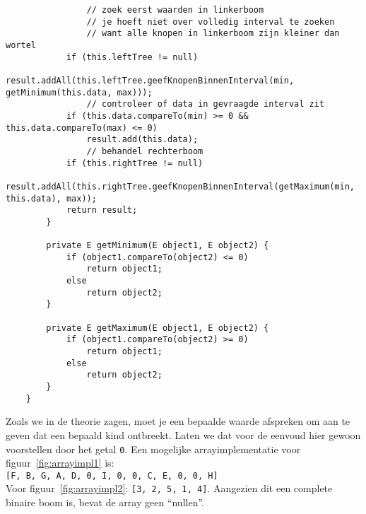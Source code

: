 \begin{Oplossing}{4.22}
\begin{lstlisting}
                // zoek eerst waarden in linkerboom
                // je hoeft niet over volledig interval te zoeken
                // want alle knopen in linkerboom zijn kleiner dan wortel
            if (this.leftTree != null)
                result.addAll(this.leftTree.geefKnopenBinnenInterval(min, getMinimum(this.data, max)));
                // controleer of data in gevraagde interval zit
            if (this.data.compareTo(min) >= 0 && this.data.compareTo(max) <= 0)
                result.add(this.data);
                // behandel rechterboom
            if (this.rightTree != null)
                result.addAll(this.rightTree.geefKnopenBinnenInterval(getMaximum(min, this.data), max));
            return result;
        }

        private E getMinimum(E object1, E object2) {
            if (object1.compareTo(object2) <= 0)
                return object1;
            else
                return object2;
        }

        private E getMaximum(E object1, E object2) {
            if (object1.compareTo(object2) >= 0)
                return object1;
            else
                return object2;
        }
    }
\end{lstlisting}
\end{Oplossing}
\begin{Oplossing}{5.1}
Zoals we in de theorie zagen, moet je een bepaalde waarde afspreken om aan te geven dat een bepaald kind ontbreekt. Laten we dat voor de eenvoud hier gewoon voorstellen door het getal \verb+0+.
Een mogelijke arrayimplementatie voor figuur~\ref{fig:arrayimpl1} is:\\
\verb+[F, B, G, A, D, 0, I, 0, 0, C, E, 0, 0, H]+ \\
Voor figuur~\ref{fig:arrayimpl2}: \verb+[3, 2, 5, 1, 4]+. Aangezien dit een complete binaire boom is, bevat de array geen “nullen”.
\end{Oplossing}
